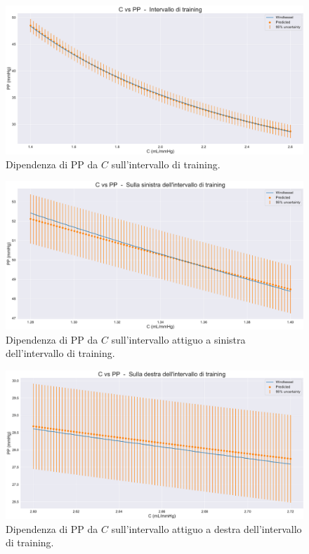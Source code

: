 \vspace{0.32cm}

\begin{figure}[!htb]
    \centering
    \includegraphics[width=1\textwidth]{images/Training (risultati)/PP/PP - C - training.pdf}
    \caption{Dipendenza di PP da $C$ sull'intervallo di training.}
    \label{PP - C - training}
\end{figure}

\begin{figure}
    \centering
    \includegraphics[width=1\textwidth]{images/Training (risultati)/PP/PP - C - sx.pdf}
    \caption{Dipendenza di PP da $C$ sull'intervallo attiguo a sinistra dell'intervallo di training.}
    \label{PP - C - sx}
\end{figure}



\begin{figure}
    \centering
    \includegraphics[width=1\textwidth]{images/Training (risultati)/PP/PP - C - dx.pdf}
    \caption{Dipendenza di PP da $C$ sull'intervallo attiguo a destra dell'intervallo di training.}
    \label{PP - C - dx}
\end{figure}





